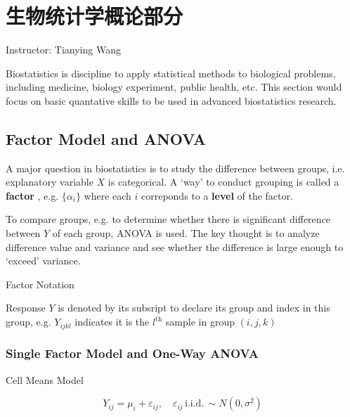 \chapter{生物统计学概论部分}\label{SectionIntroToBiostatistics}
\begin{center}
    Instructor: Tianying Wang
\end{center}

Biostatistics is discipline to apply statistical methods to biological problems, including medicine, biology experiment, public health, etc. This section would focus on basic quantative skills to be used in advanced biostatistics research.


\section{Factor Model and ANOVA}
A major question in biostatistics is to study the difference between groups, i.e. explanatory variable $ X $ is categorical. A `way' to conduct grouping is called a \textbf{factor} , e.g. $ \{\alpha _i\} $ where each $ i $ correponds to a \textbf{level} of the factor.  

To compare groups, e.g. to determine whether there is significant difference between $ Y $ of each group, ANOVA is used. The key thought is to analyze difference value and variance and see whether the difference is large enough to `exceed' variance.

\begin{point}
    Factor Notation
\end{point}

    Response $ Y $ is denoted by its subsript to declare its group and index in this group, e.g. $ Y_{ijkl} $ indicates it is the $ l^\mathrm{th}  $ sample in group $ (i,j,k) $

\subsection{Single Factor Model and One-Way ANOVA}\label{SubSubSectionIntroToBiostatisticsOneWayANOVA}

\begin{point}
    Cell Means Model
\end{point}

\[
    Y_{ij}=\mu_i +\varepsilon _{ij},\quad \varepsilon _{ij} \,\mathrm{i.i.d.}\,\sim N(0,\sigma ^2) 
\]

